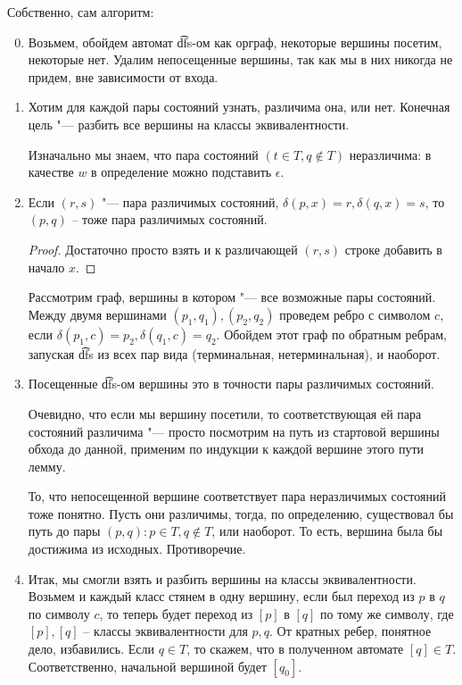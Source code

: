 Собственно, сам алгоритм:
\begin{enumerate}
\setcounter{enumi}{-1}
\item
Возьмем, обойдем автомат \t{dfs}-ом как орграф, некоторые вершины посетим, некоторые нет. 
Удалим непосещенные вершины, так как мы в них никогда не придем, вне зависимости от входа.

\item
Хотим для каждой пары состояний узнать, различима она, или нет. Конечная цель "--- разбить все вершины на классы эквивалентности.

Изначально мы знаем, что пара состояний $(t \in T, q \notin T)$ неразличима: в качестве $w$ в определение можно подставить $\epsilon$.

\item
\begin{lemma}
Если $(r, s)$ "--- пара различимых состояний, $\delta(p, x) = r, \delta(q, x) = s$, то $(p, q)$ -- тоже пара различимых состояний.
\end{lemma}
\begin{proof}
Достаточно просто взять и к различающей $(r, s)$ строке добавить в начало $x$.
\end{proof}

Рассмотрим граф, вершины в котором "--- все возможные пары состояний. Между двумя вершинами $(p_1, q_1), (p_2, q_2)$ проведем ребро с символом $c$, если $\delta(p_1, c) = p_2, \delta(q_1, c) = q_2$.
Обойдем этот граф по обратным ребрам, запуская \t{dfs} из всех пар вида (терминальная, нетерминальная), и наоборот.

\item
Посещенные \t{dfs}-ом вершины это в точности пары различимых состояний. 

Очевидно, что если мы вершину посетили, то соответствующая ей пара состояний различима "--- просто посмотрим на путь из стартовой вершины обхода до данной, применим по индукции к каждой вершине этого пути лемму.

То, что непосещенной вершине соответствует пара неразличимых состояний тоже понятно. 
Пусть они различимы, тогда, по определению, существовал бы путь до пары $(p, q): p \in T, q \notin T$, или наоборот. То есть, вершина была бы достижима из исходных. 
Противоречие.
\item
Итак, мы смогли взять и разбить вершины на классы эквивалентности. 
Возьмем и каждый класс стянем в одну вершину, если был переход из $p$ в $q$ по символу $c$, то теперь будет переход из $[p]$ в $[q]$ по тому же символу, где $[p], [q]$ -- классы эквивалентности для $p, q$. 
От кратных ребер, понятное дело, избавились.
Если $q \in T$, то скажем, что в полученном автомате $[q] \in T$. Соответственно, начальной вершиной будет $[q_0]$.


\end{enumerate}
